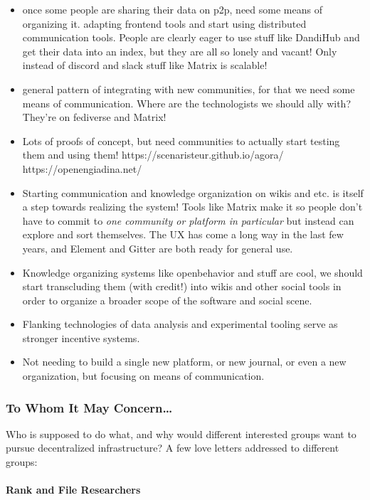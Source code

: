 \documentclass[10pt]{article}
\begin{document}
\begin{multicols}{2}
\begin{itemize}
\item
  once some people are sharing their data on p2p, need some means of
  organizing it. adapting frontend tools and start using distributed
  communication tools. People are clearly eager to use stuff like
  DandiHub and get their data into an index, but they are all so lonely
  and vacant! Only instead of discord and slack stuff like Matrix is
  scalable!
\item
  general pattern of integrating with new communities, for that we need
  some means of communication. Where are the technologists we should
  ally with? They're on fediverse and Matrix!
\item
  Lots of proofs of concept, but need communities to actually start
  testing them and using them! https://scenaristeur.github.io/agora/
  https://openengiadina.net/
\item
  Starting communication and knowledge organization on wikis and etc. is
  itself a step towards realizing the system! Tools like Matrix make it
  so people don't have to commit to \emph{one community or platform in
  particular} but instead can explore and sort themselves. The UX has
  come a long way in the last few years, and Element and Gitter are both
  ready for general use.
\item
  Knowledge organizing systems like openbehavior and stuff are cool, we
  should start transcluding them (with credit!) into wikis and other
  social tools in order to organize a broader scope of the software and
  social scene.
\item
  Flanking technologies of data analysis and experimental tooling serve
  as stronger incentive systems.
\item
  Not needing to build a single new platform, or new journal, or even a
  new organization, but focusing on means of communication.
\end{itemize}

\hypertarget{to-whom-it-may-concern}{%
\subsubsection{To Whom It May
Concern\ldots{}}\label{to-whom-it-may-concern}}

Who is supposed to do what, and why would different interested groups
want to pursue decentralized infrastructure? A few love letters
addressed to different groups:

\hypertarget{rank-and-file-researchers}{%
\paragraph{Rank and File Researchers}\label{rank-and-file-researchers}}


\end{multicols}
\end{document}
